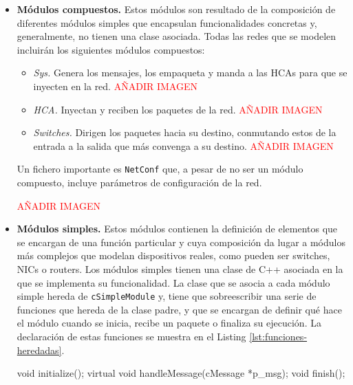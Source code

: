 \begin{itemize}
    \item \textbf{Módulos compuestos.} Estos módulos son resultado de la composición de diferentes módulos simples que encapsulan funcionalidades concretas y, generalmente, no tienen una clase asociada. Todas las redes que se modelen incluirán los siguientes módulos compuestos:
        \begin{itemize}
            \item \emph{Sys.} Genera los mensajes, los empaqueta y manda a las HCAs para que se inyecten en la red.
            \textcolor{red}{AÑADIR IMAGEN}

            \item \emph{HCA.} Inyectan y reciben los paquetes de la red.
            \textcolor{red}{AÑADIR IMAGEN}

            \item \emph{Switches.} Dirigen los paquetes hacia su destino, conmutando estos de la entrada a la salida que más convenga a su destino.
            \textcolor{red}{AÑADIR IMAGEN}

        \end{itemize}

    \begin{keyconceptbox}[NetConf]
        Un fichero importante es \verb|NetConf| que, a pesar de no ser un módulo compuesto, incluye parámetros de configuración de la red.

        \textcolor{red}{AÑADIR IMAGEN}        
    \end{keyconceptbox}
    
    \item \textbf{Módulos simples.} Estos módulos contienen la definición de elementos que se encargan de una función particular y cuya composición da lugar a módulos más complejos que modelan dispositivos reales, como pueden ser switches, NICs o routers. Los módulos simples tienen una clase de C++ asociada en la que se implementa su funcionalidad. La clase que se asocia a cada módulo simple hereda de \verb|cSimpleModule| y, tiene que sobreescribir una serie de funciones que hereda de la clase padre, y que se encargan de definir qué hace el módulo cuando se inicia, recibe un paquete o finaliza su ejecución. La declaración de estas funciones se muestra en el Listing \ref{lst:funciones-heredadas}.

    \begin{mycode}[style=bashstyle, label=lst:funciones-heredadas, caption={Declaración de las funciones que se heredan de cSimpleModule, y que hay que sobreescribir.}]
void initialize();
virtual void handleMessage(cMessage *p_msg);
void finish();
    \end{mycode}


\end{itemize}
